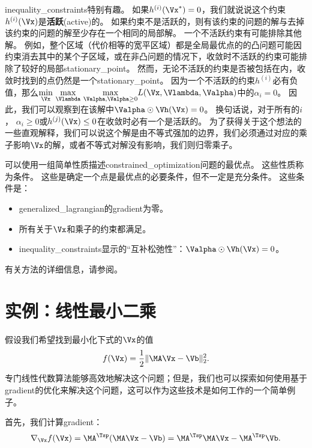 \gls{inequality_constraints}特别有趣。
如果$h^{(i)}(\Vx^*)= 0$，我们就说说这个约束$h^{(i)}(\Vx)$是\textbf{活跃}(active)的。
如果约束不是活跃的，则有该约束的问题的解与去掉该约束的问题的解至少存在一个相同的局部解。
一个不活跃约束有可能排除其他解。
例如，整个区域（代价相等的宽平区域）都是全局最优点的的凸问题可能因约束消去其中的某个子区域，或在非凸问题的情况下，收敛时不活跃的约束可能排除了较好的局部\gls{stationary_point}。
然而，无论不活跃的约束是否被包括在内，收敛时找到的点仍然是一个\gls{stationary_point}。
因为一个不活跃的约束$h^{(i)}$必有负值，那么$
 \underset{\Vx}{\min}~  \underset{\Vlambda}{\max}~
 \underset{\Valpha, \Valpha \geq 0}{\max}   L(\Vx, \Vlambda, \Valpha) 
$中的$\alpha_i = 0$。
因此，我们可以观察到在该解中$\Valpha \odot \Vh(\Vx) = 0$。
换句话说，对于所有的$i$， $\alpha_i \geq 0$或$ h^{(j)}(\Vx) \leq 0$在收敛时必有一个是活跃的。
为了获得关于这个想法的一些直观解释，我们可以说这个解是由不等式强加的边界，我们必须通过对应的乘子影响$\Vx$的解，或者不等式对解没有影响，我们则归零乘子。

可以使用一组简单性质描述\gls{constrained_optimization}问题的最优点。
这些性质称为条件\citep{Karush39,kuhn1951}。
这些是确定一个点是最优点的必要条件，但不一定是充分条件。
这些条件是：
\begin{itemize}
 \item \gls{generalized_lagrangian}的\gls{gradient}为零。
 \item 所有关于$\Vx$和乘子的约束都满足。
 \item \gls{inequality_constraints}显示的``互补松弛性''：$\Valpha \odot \Vh(\Vx) = 0$。
\end{itemize}
有关方法的详细信息，请参阅\cite{NumOptBook}。


\section{实例：线性最小二乘}
\label{sec:example_linear_least_squares}
假设我们希望找到最小化下式的$\Vx$的值
\begin{align}
 f(\Vx) = \frac{1}{2}\| \MA \Vx - \Vb \|_2^2 .
\end{align}
专门线性代数算法能够高效地解决这个问题；但是，我们也可以探索如何使用基于\gls{gradient}的优化来解决这个问题，这可以作为这些技术是如何工作的一个简单例子。

首先，我们计算\gls{gradient}：
\begin{align}
 \nabla_{\Vx} f(\Vx) = \MA^\Tsp (\MA \Vx - \Vb) = \MA^\Tsp \MA \Vx - \MA^\Tsp \Vb .
\end{align}

